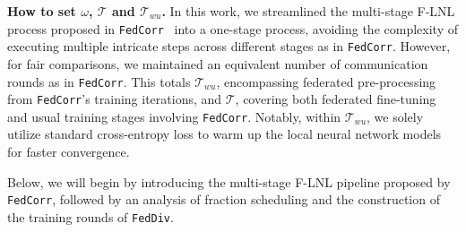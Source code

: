 \documentclass[letterpaper]{article} %
\begin{document}
\noindent
\textbf{How to set $\omega$, $\mathcal{T}$ and $\mathcal{T}_{wu}$.}
In this work, we streamlined the multi-stage F-LNL process proposed in \texttt{FedCorr}~\cite{xu2022fedcorr} into a one-stage process, avoiding the complexity of executing multiple intricate steps across different stages as in \texttt{FedCorr}. However, for fair comparisons, we maintained an equivalent number of communication rounds as in \texttt{FedCorr}. This totals $\mathcal{T}_{wu}$, encompassing federated pre-processing from \texttt{FedCorr}'s training iterations, and $\mathcal{T}$, covering both federated fine-tuning and usual training stages involving \texttt{FedCorr}. Notably, within $\mathcal{T}_{wu}$, we solely utilize standard cross-entropy loss to warm up the local neural network models for faster convergence.

Below, we will begin by introducing the multi-stage F-LNL pipeline proposed by \texttt{FedCorr}, followed by an analysis of fraction scheduling and the construction of the training rounds of \texttt{FedDiv}.
  
\end{document}
